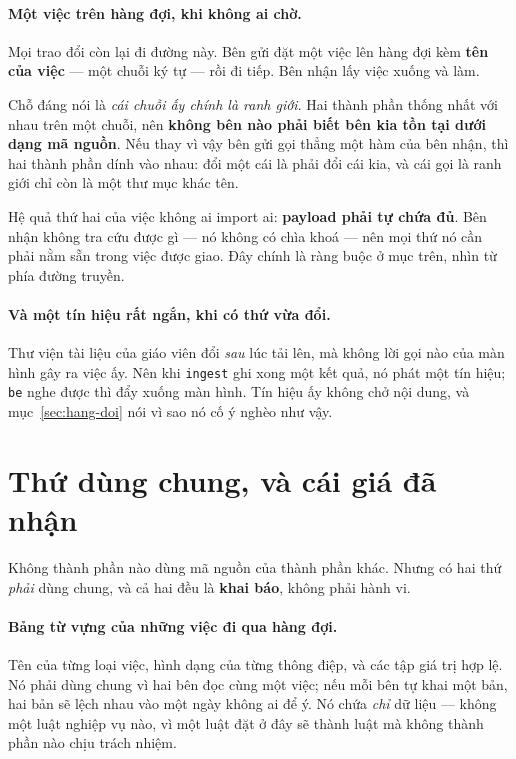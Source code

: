 \paragraph{Một việc trên hàng đợi, khi không ai chờ.} Mọi trao đổi còn lại đi đường này. Bên gửi
đặt một việc lên hàng đợi kèm \textbf{tên của việc} --- một chuỗi ký tự --- rồi đi tiếp. Bên nhận
lấy việc xuống và làm.

Chỗ đáng nói là \emph{cái chuỗi ấy chính là ranh giới}. Hai thành phần thống nhất với nhau trên
một chuỗi, nên \textbf{không bên nào phải biết bên kia tồn tại dưới dạng mã nguồn}. Nếu thay vì
vậy bên gửi gọi thẳng một hàm của bên nhận, thì hai thành phần dính vào nhau: đổi một cái là phải
đổi cái kia, và cái gọi là ranh giới chỉ còn là một thư mục khác tên.

Hệ quả thứ hai của việc không ai import ai: \textbf{payload phải tự chứa đủ}. Bên nhận không tra
cứu được gì --- nó không có chìa khoá --- nên mọi thứ nó cần phải nằm sẵn trong việc được giao.
Đây chính là ràng buộc ở mục trên, nhìn từ phía đường truyền.

\paragraph{Và một tín hiệu rất ngắn, khi có thứ vừa đổi.} Thư viện tài liệu của giáo viên đổi
\emph{sau} lúc tải lên, mà không lời gọi nào của màn hình gây ra việc ấy. Nên khi \texttt{ingest}
ghi xong một kết quả, nó phát một tín hiệu; \texttt{be} nghe được thì đẩy xuống màn hình. Tín
hiệu ấy không chở nội dung, và mục~\ref{sec:hang-doi} nói vì sao nó cố ý nghèo như vậy.

\section{Thứ dùng chung, và cái giá đã nhận}

Không thành phần nào dùng mã nguồn của thành phần khác. Nhưng có hai thứ \emph{phải} dùng chung,
và cả hai đều là \textbf{khai báo}, không phải hành vi.

\paragraph{Bảng từ vựng của những việc đi qua hàng đợi.} Tên của từng loại việc, hình dạng của
từng thông điệp, và các tập giá trị hợp lệ. Nó phải dùng chung vì hai bên đọc cùng một việc; nếu
mỗi bên tự khai một bản, hai bản sẽ lệch nhau vào một ngày không ai để ý. Nó chứa \emph{chỉ} dữ
liệu --- không một luật nghiệp vụ nào, vì một luật đặt ở đây sẽ thành luật mà không thành phần
nào chịu trách nhiệm.

